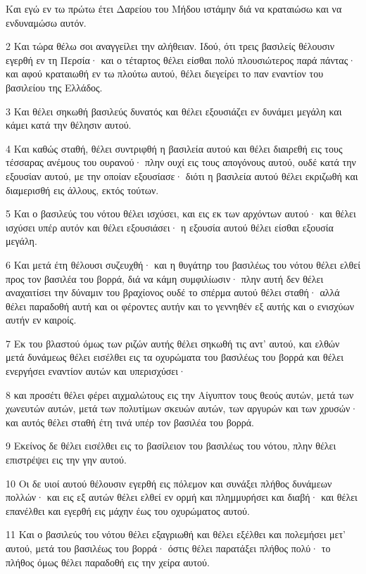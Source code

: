 \par Και εγώ εν τω πρώτω έτει Δαρείου του Μήδου ιστάμην διά να κραταιώσω και να ενδυναμώσω αυτόν.
\par 2 Και τώρα θέλω σοι αναγγείλει την αλήθειαν. Ιδού, ότι τρεις βασιλείς θέλουσιν εγερθή εν τη Περσία· και ο τέταρτος θέλει είσθαι πολύ πλουσιώτερος παρά πάντας· και αφού κραταιωθή εν τω πλούτω αυτού, θέλει διεγείρει το παν εναντίον του βασιλείου της Ελλάδος.
\par 3 Και θέλει σηκωθή βασιλεύς δυνατός και θέλει εξουσιάζει εν δυνάμει μεγάλη και κάμει κατά την θέλησιν αυτού.
\par 4 Και καθώς σταθή, θέλει συντριφθή η βασιλεία αυτού και θέλει διαιρεθή εις τους τέσσαρας ανέμους του ουρανού· πλην ουχί εις τους απογόνους αυτού, ουδέ κατά την εξουσίαν αυτού, με την οποίαν εξουσίασε· διότι η βασιλεία αυτού θέλει εκριζωθή και διαμερισθή εις άλλους, εκτός τούτων.
\par 5 Και ο βασιλεύς του νότου θέλει ισχύσει, και εις εκ των αρχόντων αυτού· και θέλει ισχύσει υπέρ αυτόν και θέλει εξουσιάσει· η εξουσία αυτού θέλει είσθαι εξουσία μεγάλη.
\par 6 Και μετά έτη θέλουσι συζευχθή· και η θυγάτηρ του βασιλέως του νότου θέλει ελθεί προς τον βασιλέα του βορρά, διά να κάμη συμφιλίωσιν· πλην αυτή δεν θέλει αναχαιτίσει την δύναμιν του βραχίονος ουδέ το σπέρμα αυτού θέλει σταθή· αλλά θέλει παραδοθή αυτή και οι φέροντες αυτήν και το γεννηθέν εξ αυτής και ο ενισχύων αυτήν εν καιροίς.
\par 7 Εκ του βλαστού όμως των ριζών αυτής θέλει σηκωθή τις αντ' αυτού, και ελθών μετά δυνάμεως θέλει εισέλθει εις τα οχυρώματα του βασιλέως του βορρά και θέλει ενεργήσει εναντίον αυτών και υπερισχύσει·
\par 8 και προσέτι θέλει φέρει αιχμαλώτους εις την Αίγυπτον τους θεούς αυτών, μετά των χωνευτών αυτών, μετά των πολυτίμων σκευών αυτών, των αργυρών και των χρυσών· και αυτός θέλει σταθή έτη τινά υπέρ τον βασιλέα του βορρά.
\par 9 Εκείνος δε θέλει εισέλθει εις το βασίλειον του βασιλέως του νότου, πλην θέλει επιστρέψει εις την γην αυτού.
\par 10 Οι δε υιοί αυτού θέλουσιν εγερθή εις πόλεμον και συνάξει πλήθος δυνάμεων πολλών· και εις εξ αυτών θέλει ελθεί εν ορμή και πλημμυρήσει και διαβή· και θέλει επανέλθει και εγερθή εις μάχην έως του οχυρώματος αυτού.
\par 11 Και ο βασιλεύς του νότου θέλει εξαγριωθή και θέλει εξέλθει και πολεμήσει μετ' αυτού, μετά του βασιλέως του βορρά· όστις θέλει παρατάξει πλήθος πολύ· το πλήθος όμως θέλει παραδοθή εις την χείρα αυτού.
